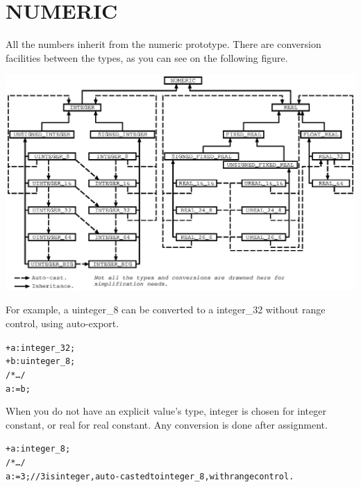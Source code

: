 \documentclass[11pt]{mybook}
\begin{document}
\section{NUMERIC}
\label{library:numeric}
%
All the numbers inherit from the {\sc{}numeric} prototype.
There are conversion facilities between the types, as you can see on the following figure.
\begin{center}
\includegraphics[scale=0.97]{figures/numeric_en}
\end{center}

For example, a {\sc{}uinteger\_8} can be converted to a {\sc{}integer\_32} without range control, using auto-export.
\begin{alltt}
  + a:{\sc{}integer\_32};
  + b:{\sc{}uinteger\_8};
  /* \ldots */
  a := b;
\end{alltt}
When you do not have an explicit value's type, {\sc{}integer} is chosen for integer 
constant, or {\sc{}real} for real constant. Any conversion is done after assignment.
\begin{alltt}
  + a:{\sc{}integer\_8};
  /* \ldots */
  a := 3;    // 3 is {\sc{}integer}, auto-casted to {\sc{}integer_8}, with range control.
\end{alltt}
\end{document}
